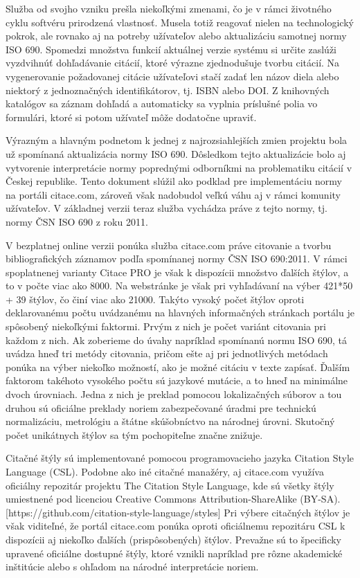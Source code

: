 \documentclass{fithesis3}
\begin{document}
	Služba od svojho vzniku prešla niekoľkými zmenami, čo je v rámci životného cyklu softvéru prirodzená vlastnosť. Musela totiž reagovať nielen na technologický pokrok, ale rovnako aj na potreby užívateľov alebo aktualizáciu samotnej normy ISO 690. Spomedzi množstva funkcií aktuálnej verzie systému si určite zaslúži vyzdvihnúť dohľadávanie citácií, ktoré výrazne zjednodušuje tvorbu citácií. Na vygenerovanie požadovanej citácie užívateľovi stačí zadať len názov diela alebo niektorý z jednoznačných identifikátorov, tj. ISBN alebo DOI. Z knihovných katalógov sa záznam dohľadá a automaticky sa vyplnia príslušné polia vo formulári, ktoré si potom užívateľ môže dodatočne upraviť.

	Výrazným a hlavným podnetom k jednej z najrozsiahlejších zmien projektu bola už spomínaná aktualizácia normy ISO 690. Dôsledkom tejto aktualizácie bolo aj vytvorenie interpretácie normy poprednými odborníkmi na problematiku citácií v Českej republike. Tento dokument slúžil ako podklad pre implementáciu normy na portáli citace.com, zároveň však nadobudol veľkú váhu aj v rámci komunity užívateľov. V základnej verzii teraz služba vychádza práve z tejto normy, tj. normy ČSN ISO 690 z roku 2011.
	
	V bezplatnej online verzii ponúka služba citace.com práve citovanie a tvorbu bibliografických záznamov podľa spomínanej normy ČSN ISO 690:2011. V rámci spoplatnenej varianty Citace PRO je však k dispozícii množstvo ďalších štýlov, a to v počte viac ako 8000. Na webstránke je však pri vyhľadávaní na výber 421*50 + 39 štýlov, čo činí viac ako 21000. Takýto vysoký počet štýlov oproti deklarovanému počtu uvádzanému na hlavných informačných stránkach portálu je spôsobený niekoľkými faktormi. Prvým z nich je počet variánt citovania pri každom z nich. Ak zoberieme do úvahy napríklad spomínanú normu ISO 690, tá uvádza hneď tri metódy citovania, pričom ešte aj pri jednotlivých metódach ponúka na výber niekoľko možností, ako je možné citáciu v texte zapísať. Ďalším faktorom takéhoto vysokého počtu sú jazykové mutácie, a to hneď na minimálne dvoch úrovniach. Jedna z nich je preklad pomocou lokalizačných súborov a tou druhou sú oficiálne preklady noriem zabezpečované úradmi pre technickú normalizáciu, metrológiu a štátne skúšobníctvo na národnej úrovni. Skutočný počet unikátnych štýlov sa tým pochopiteľne značne znižuje.
	
	Citačné štýly sú implementované pomocou programovacieho jazyka Citation Style Language (CSL). Podobne ako iné citačné manažéry, aj citace.com využíva oficiálny repozitár projektu The Citation Style Language, kde sú všetky štýly umiestnené pod licenciou Creative Commons Attribution-ShareAlike (BY-SA). [https://github.com/citation-style-language/styles] Pri výbere citačných štýlov je však viditeľné, že portál citace.com ponúka oproti oficiálnemu repozitáru CSL k dispozícii aj niekoľko ďalších (prispôsobených) štýlov. Prevažne sú to špecificky upravené oficiálne dostupné štýly, ktoré vznikli napríklad pre rôzne akademické inštitúcie alebo s ohľadom na národné interpretácie noriem.
	
\end{document}
